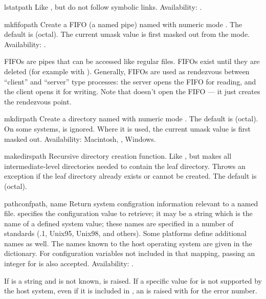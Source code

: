 \begin{funcdesc}{lstat}{path}
Like , but do not follow symbolic links.
Availability: \UNIX{}.
\end{funcdesc}

\begin{funcdesc}{mkfifo}{path}
Create a FIFO (a named pipe) named  with numeric mode
.  The default  is  (octal).  The current
umask value is first masked out from the mode.
Availability: \UNIX{}.

FIFOs are pipes that can be accessed like regular files.  FIFOs exist
until they are deleted (for example with ).
Generally, FIFOs are used as rendezvous between ``client'' and
``server'' type processes: the server opens the FIFO for reading, and
the client opens it for writing.  Note that 
doesn't open the FIFO --- it just creates the rendezvous point.
\end{funcdesc}

\begin{funcdesc}{mkdir}{path}
Create a directory named  with numeric mode .
The default  is  (octal).  On some systems,
 is ignored.  Where it is used, the current umask value is
first masked out.
Availability: Macintosh, \UNIX{}, Windows.
\end{funcdesc}

\begin{funcdesc}{makedirs}{path}
Recursive directory creation function.  Like ,
but makes all intermediate-level directories needed to contain the
leaf directory.  Throws an  exception if the leaf
directory already exists or cannot be created.  The default 
is  (octal).
\end{funcdesc}

\begin{funcdesc}{pathconf}{path, name}
Return system configration information relevant to a named file.
 specifies the configuration value to retrieve; it may be a
string which is the name of a defined system value; these names are
specified in a number of standards (\POSIX.1, Unix95, Unix98, and
others).  Some platforms define additional names as well.  The names
known to the host operating system are given in the
 dictionary.  For configuration variables not
included in that mapping, passing an integer for  is also
accepted.
Availability: \UNIX{}.

If  is a string and is not known,  is
raised.  If a specific value for  is not supported by the
host system, even if it is included in , an
 is raised with  for the
error number.
\end{funcdesc}

